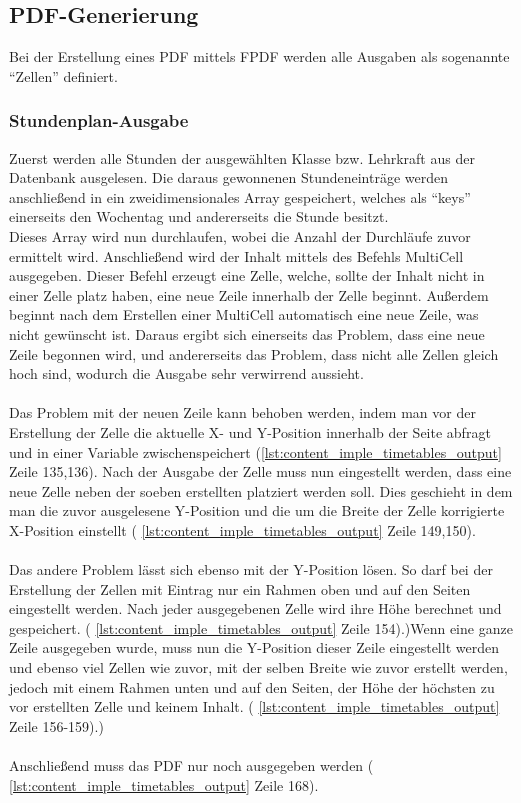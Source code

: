 \subsection{PDF-Generierung}
Bei der Erstellung eines PDF mittels FPDF werden alle Ausgaben als sogenannte \enquote{Zellen} definiert.
\subsubsection{Stundenplan-Ausgabe}
Zuerst werden alle Stunden der ausgewählten Klasse bzw. Lehrkraft aus der Datenbank ausgelesen. Die daraus gewonnenen Stundeneinträge werden anschließend in ein zweidimensionales Array gespeichert, welches als \enquote{keys} einerseits den Wochentag und andererseits die Stunde besitzt. \\
Dieses Array wird nun durchlaufen, wobei die Anzahl der Durchläufe zuvor ermittelt wird. Anschließend wird der Inhalt mittels des Befehls MultiCell ausgegeben. Dieser Befehl erzeugt eine Zelle, welche, sollte der Inhalt nicht in einer Zelle platz haben, eine neue Zeile innerhalb der Zelle beginnt. Außerdem beginnt nach dem Erstellen einer MultiCell automatisch eine neue Zeile, was nicht gewünscht ist. Daraus ergibt sich einerseits das Problem, dass eine neue Zeile begonnen wird, und andererseits das Problem, dass nicht alle Zellen gleich hoch sind, wodurch die Ausgabe sehr verwirrend aussieht. \\\\
Das Problem mit der neuen Zeile kann behoben werden, indem man vor der Erstellung der Zelle die aktuelle X- und Y-Position innerhalb der Seite abfragt und in einer Variable zwischenspeichert (\autoref{lst:content_imple_timetables_output} Zeile 135,136). Nach der Ausgabe der Zelle muss nun eingestellt werden, dass eine neue Zelle neben der soeben erstellten platziert werden soll. Dies geschieht in dem man die zuvor ausgelesene Y-Position und die um die Breite der Zelle korrigierte X-Position einstellt ( \autoref{lst:content_imple_timetables_output} Zeile 149,150).\\\\
Das andere Problem lässt sich ebenso mit der Y-Position lösen. So darf bei der Erstellung der Zellen mit Eintrag nur ein Rahmen oben und auf den Seiten eingestellt werden. Nach jeder ausgegebenen Zelle wird ihre Höhe berechnet und gespeichert. ( \autoref{lst:content_imple_timetables_output} Zeile 154).)Wenn eine ganze Zeile ausgegeben wurde, muss nun die Y-Position dieser Zeile eingestellt werden und ebenso viel Zellen wie zuvor, mit der selben Breite wie zuvor erstellt werden, jedoch mit einem Rahmen unten und auf den Seiten, der Höhe der höchsten zu vor erstellten Zelle und keinem Inhalt.  ( \autoref{lst:content_imple_timetables_output} Zeile 156-159).)
\\\\
Anschließend muss das PDF nur noch ausgegeben werden ( \autoref{lst:content_imple_timetables_output} Zeile 168). 

